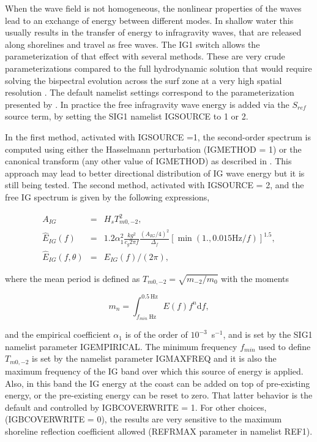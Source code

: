 When the wave field is not homogeneous, the nonlinear properties of the waves
lead to an exchange of energy between different modes. In shallow water this
usually results in the transfer of energy to infragravity waves, that are
released along shorelines and travel as free waves. The {\code IG1} switch
allows the parameterization of that effect with several methods.  These are
very crude parameterizations compared to the full hydrodynamic solution that
would require solving the bispectral evolution across the surf zone at a very
high spatial resolution \citep[e.g.][]{art:HB97}. The default namelist settings
correspond to the parameterization presented by \cite{art:Aea14}.
 In practice the free infragravity wave energy is
added via the $S_{ref}$ source term, by setting the {\code SIG1} namelist
{\code IGSOURCE} to 1 or 2.

In the first method, activated with {\code IGSOURCE =1}, the second-order
spectrum is computed using either the Hasselmann perturbation ({\code IGMETHOD
= 1}) or the canonical transform (any other value of {\code IGMETHOD}) as described 
in \cite{art:Jan09}. This
approach may lead to better directional distribution of IG wave energy but it
is still being tested.  The second method, activated with {\code IGSOURCE =
2}, and the free IG spectrum is given by the following expressions,

\begin{eqnarray}
 A_{IG} & =&    H_s T_{m0,-2}^2\label{eq:IGfit0}, \\
\widehat{E}_{IG}(f)& = & 1.2 \alpha_1^2 \frac{k g^2}{c_g 2 \pi f} \frac{(A_{IG}/4)^2}{\Delta_f}  
\left[\min( 1., 0.015\mathrm{Hz}/ f)\right]^{1.5}, \label{eq:IGfit1} \\
 \widehat{E}_{IG}(f,\theta) & = & \widehat{E}_{IG}(f) / (2 \pi ),
\label{eq:fit2} 
\end{eqnarray}

\noindent
where the mean period is defined as $ T_{m0,-2} =\sqrt{m_{-2}/m_{0}}$ with the
moments

\begin{equation}
 m_n= \int_{f_{min}~\mathrm{Hz}}^{0.5~\mathrm{Hz}} E(f) f^n {\mathrm d}f,\label{eq:mn}
\end{equation}

\noindent
and the empirical coefficient $\alpha_1$ is of the order of
$10^{-3}$~s$^{-1}$, and is set by the {\code SIG1} namelist parameter {\code
IGEMPIRICAL}. The minimum frequency $f_{min}$ used to define $ T_{m0,-2}$ is
set by the namelist parameter {\code IGMAXFREQ} and it is also the maximum
frequency of the IG band over which this source of energy is applied.  Also,
in this band the IG energy at the coast can be added on top of pre-existing
energy, or the pre-existing energy can be reset to zero. That latter behavior
is the default and controlled by {\code IGBCOVERWRITE = 1}. For other choices,
({\code IGBCOVERWRITE = 0}), the results are very sensitive to the maximum
shoreline reflection coefficient allowed ({\code REFRMAX} parameter in
namelist {\F REF1}).

